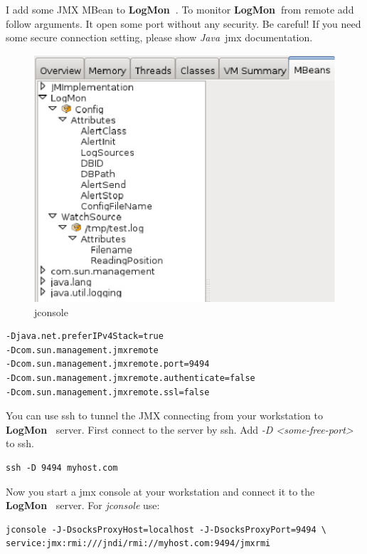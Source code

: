 \documentclass[11pt,a4paper]{article}
\newcommand{\logmon}{\textbf{LogMon\ }}
\newcommand{\java}{\textit{Java\ }}
\begin{document}
I add some JMX MBean to \logmon. To monitor \logmon from remote add follow
arguments. It open some port without any security. Be careful!
If you need some secure connection setting, please show \java jmx documentation.

\begin{figure}[h]
\centering
\includegraphics{img/jconsole.eps}
\caption{jconsole}
\end{figure}

\begin{verbatim}
-Djava.net.preferIPv4Stack=true
-Dcom.sun.management.jmxremote
-Dcom.sun.management.jmxremote.port=9494
-Dcom.sun.management.jmxremote.authenticate=false
-Dcom.sun.management.jmxremote.ssl=false
\end{verbatim}

You can use ssh to tunnel the JMX  connecting from your workstation to \logmon
server. First connect to the server by ssh. Add \textit{-D \textless{}some-free-port\textgreater{}  } to ssh.

\begin{verbatim}
ssh -D 9494 myhost.com
\end{verbatim}

Now you start a jmx console at your workstation and connect it to the \logmon
server. For \textit{jconsole} use:

\begin{verbatim}
jconsole -J-DsocksProxyHost=localhost -J-DsocksProxyPort=9494 \
service:jmx:rmi:///jndi/rmi://myhost.com:9494/jmxrmi
\end{verbatim}
\end{document}
